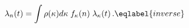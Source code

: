 \begin{equation}
\lambda_n(t) = \int \rho(\kappa)d\kappa\; f_\kappa(n)\;\lambda_\kappa(t)\,.
\eqlabel{inverse}
\end{equation}

